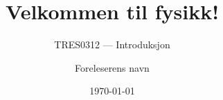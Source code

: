 \documentclass[aspectratio=169, 12pt]{beamer}
\title{Velkommen til fysikk!}
\subtitle{TRES0312 --- Introduksjon}
\author{Foreleserens navn}
\date{\today}
\begin{document}
\begin{frame}[plain]
  \titlepage
\end{frame}

\begin{frame}{}
\end{frame}
\end{document}
